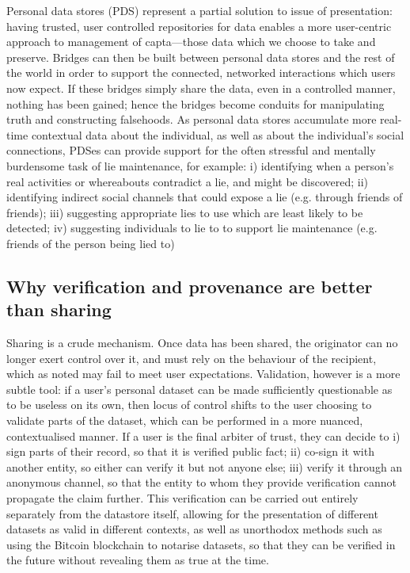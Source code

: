 \documentclass{IOS-Book-Article}     %
\begin{document}
Personal data stores (PDS) represent a partial solution to issue of
presentation: having trusted, user controlled repositories for data enables a
more user-centric approach to management of capta---those data which we choose
to take and preserve. Bridges can then be built between personal data stores and
the rest of the world in order to support the connected, networked interactions
which users now expect. If these bridges simply share the data, even in a
controlled manner, nothing has been gained; hence the bridges become conduits
for manipulating truth and constructing falsehoods. As personal data stores
accumulate more real-time contextual data about the individual, as well as about
the individual’s social connections, PDSes can provide support for the often
stressful and mentally burdensome task of lie maintenance, for example: i)
identifying when a person's real activities or whereabouts contradict a lie, and
might be discovered; ii) identifying indirect social channels that could expose
a lie (e.g. through friends of friends); iii) suggesting appropriate lies to use
which are least likely to be detected; iv) suggesting individuals to lie to to
support lie maintenance (e.g. friends of the person being lied to)

\subsection{Why verification and provenance are better than sharing}


Sharing is a crude mechanism. Once data has been shared, the originator can no
longer exert control over it, and must rely on the behaviour of the recipient,
which as noted may fail to meet user expectations. Validation, however is a more
subtle tool: if a user’s personal dataset can be made sufficiently questionable
as to be useless on its own, then locus of control shifts to the user choosing
to validate parts of the dataset, which can be performed in a more nuanced,
contextualised manner. If a user is the final arbiter of trust, they can decide
to i) sign parts of their record, so that it is verified public fact; ii)
co-sign it with another entity, so either can verify it but not anyone else;
iii) verify it through an anonymous channel, so that the entity to whom they
provide verification cannot propagate the claim further. This verification can
be carried out entirely separately from the datastore itself, allowing for the
presentation of different datasets as valid  in different contexts, as well as
unorthodox methods such as using the Bitcoin blockchain to notarise datasets, so
that they can be verified in the future without revealing them as true at the
time.
\end{document}
